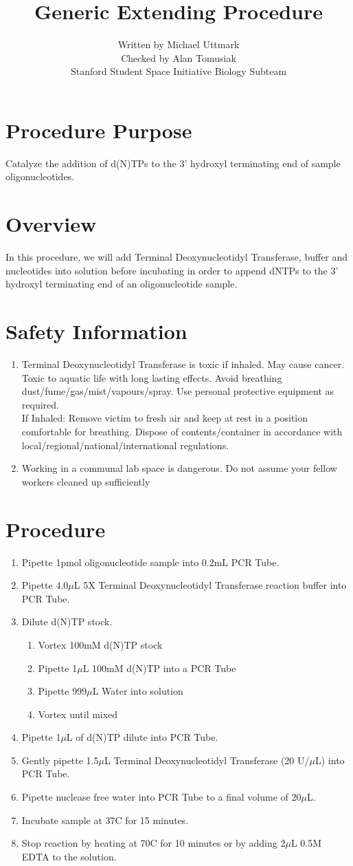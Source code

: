 \documentclass[a4paper]{article}
\title{Generic \tdt{} Extending Procedure}
\author{Written by Michael Uttmark\\
		Checked by Alan Tomusiak\\
        Stanford Student Space Initiative Biology Subteam}
\newenvironment{safety}{%
\begin{tcolorbox}[width=\textwidth, colframe=safetyFrame, arc=1.5mm]
}%
{\end{tcolorbox}}
\newcommand{\C}{\degree C}
\newcommand{\uL}{$\mu$L}
\newcommand{\Dilution}[4]{
\begin{enumerate}
\item{Vortex #2 stock}
\item{Pipette #1\uL{} #2 into a PCR Tube}
\item{Pipette #3\uL{} #4 into solution}
\item{Vortex until mixed}
\end{enumerate}
}
\newcommand{\tdt}{Terminal Deoxynucleotidyl Transferase}
\begin{document}
\maketitle

\section*{Procedure Purpose}
Catalyze the addition of d(N)TPs to the 3' hydroxyl terminating end of  sample oligonucleotides.

\section*{Overview}
In this procedure, we will add \tdt{}, buffer and nucleotides into solution before incubating in order to append dNTPs to the 3' hydroxyl terminating end of an oligonucleotide sample. 

\section*{Safety Information} %
\begin{safety}
\begin{enumerate}
\item{\tdt{} is toxic if inhaled. May cause cancer. Toxic to aquatic life with long lasting effects. Avoid breathing dust/fume/gas/mist/vapours/spray. Use personal protective equipment as required. \\If Inhaled: Remove victim to fresh air and keep at rest in a position comfortable for breathing. Dispose of contents/container in accordance with local/regional/national/international regulations.\cite{ThermoScientific2016}}
\item{Working in a communal lab space is dangerous. Do not assume your fellow workers cleaned up sufficiently}
\end{enumerate}
\end{safety}
\section*{Procedure}
\begin{enumerate}
\item{Pipette 1pmol oligonucleotide sample into 0.2mL PCR Tube.}
\item{Pipette 4.0\uL{} 5X \tdt{} reaction buffer into PCR Tube.}
\item{Dilute d(N)TP stock.}
\Dilution{1}{100mM d(N)TP}{999}{Water}
\item{Pipette 1\uL{} of d(N)TP dilute into PCR Tube.}
\item{Gently pipette 1.5\uL{} \tdt{} (20 U/\uL{}) into PCR Tube.} %
\item{Pipette nuclease free water into PCR Tube to a final volume of 20\uL{}.}
\item{Incubate sample at 37\C{} for 15 minutes.}
\item{Stop reaction by heating at 70\C{} for 10 minutes or by adding 2\uL{} 0.5M EDTA to the solution.\cite{Invitrogen2002}}

\end{enumerate}
\end{document}

